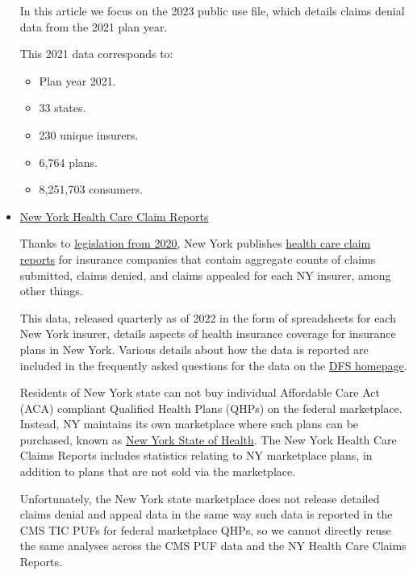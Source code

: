 \documentclass[12pt, a4paper,twoside,parskip=full]{report}
\theoremstyle{plain} %
\theoremstyle{definition} %
\theoremstyle{remark} %
\numberwithin{equation}{chapter}
\begin{document}
\begin{itemize}
\begin{tcolorbox}
			In this article we focus on the 2023 public use file, which details claims denial data from the 2021 plan year.
			
			This 2021 data corresponds to:
			
			\begin{itemize}
				\item Plan year 2021.
				\item 33 states.
				\item 230 unique insurers.
				\item 6,764 plans.
				\item 8,251,703 consumers.
			\end{itemize}
		
			\end{tcolorbox}
			\item \href{https://www.dfs.ny.gov/reports_and_publications/health_care_claim_reports}{New York Health Care Claim Reports}\\
			
			\begin{tcolorbox}
			Thanks to \href{https://www.nysenate.gov/legislation/laws/ISC/345}{legislation from 2020}, New York publishes \href{https://www.dfs.ny.gov/reports_and_publications/health_care_claim_reports}{health care claim reports} for insurance companies that contain aggregate counts of claims submitted, claims denied, and claims appealed for each NY insurer, among other things. 
			
			This data, released quarterly as of 2022 in the form of spreadsheets for each New York insurer, details aspects of health insurance coverage for insurance plans in New York. Various details about how the data is reported are included in the frequently asked questions for the data on the \href{https://www.dfs.ny.gov/apps_and_licensing/health_care_claim_reports}{DFS homepage}. 
			
			Residents of New York state can not buy individual Affordable Care Act (ACA) compliant Qualified Health Plans (QHPs) on the federal marketplace. Instead, NY maintains its own marketplace where such plans can be purchased, known as \href{https://nystateofhealth.ny.gov/}{New York State of Health}. The New York Health Care Claims Reports includes statistics relating to NY marketplace plans, in addition to plans that are not sold via the marketplace. 
			
			Unfortunately, the New York state marketplace does not release detailed claims denial and appeal data in the same way such data is reported in the CMS TIC PUFs for federal marketplace QHPs, so we cannot directly reuse the same analyses across the CMS PUF data and the NY Health Care Claims Reports.
			

\end{tcolorbox}
\end{itemize}
\end{document}
